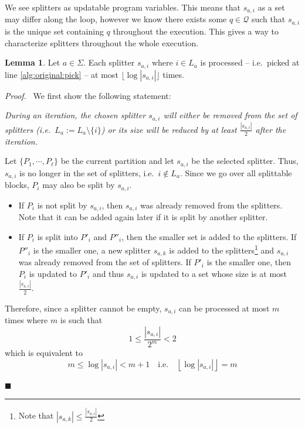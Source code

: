 \documentclass[12pt, a4 paper]{article}
\renewenvironment{proof}[1][Proof]{\begin{mdframed}[backgroundcolor=black!5, topline=false, rightline=false, bottomline=false, linecolor=black!15, linewidth=3pt]{\noindent\textit{#1.}\ }}{\noindent\par\hfill$\blacksquare$\end{mdframed}}
\theoremstyle{definition}
\newtheorem{lemma}{Lemma}
\begin{document}
We see splitters as updatable program variables. This means that $s_{a,i}$ as a set may differ along the loop, however we know there exists some $q \in \mathcal{Q}$ such that $s_{a,i}$ is the unique set containing $q$ throughout the execution. This gives a way to characterize splitters throughout the whole execution.
\begin{lemma}\label{lem:log}
    Let $a \in \Sigma$. Each splitter $s_{a,i}$ where $i\in L_a$ is processed -- i.e.\ picked at line \ref{alg:original:pick} -- at most $\lfloor \log \left| s_{a,i} \right| \rfloor$ times.
\end{lemma}
\begin{proof}
    We first show the following statement:

    \textit{During an iteration, the chosen splitter $s_{a,i}$ will either be removed from the set of splitters (i.e.\ $L_a := L_a \setminus \{i\}$) or its size will be reduced by at least $\frac{\left| s_{a, i}\right|}{2}$ after the iteration.}

    \bigskip
    Let $\{P_1, \cdots, P_\ell\}$ be the current partition and let $s_{a, i}$ be the selected splitter. Thus, $s_{a, i}$ is no longer in the set of splitters, i.e.\ $i \notin L_a$. Since we go over all splittable blocks, $P_i$ may also be split by $s_{a, i}$.
    \begin{itemize}
        \item If $P_i$ is not split by $s_{a, i}$, then $s_{a, i}$ was already removed from the splitters. Note that it can be added again later if it is split by another splitter.
        \item If $P_i$ is split into $P'_i$ and $P''_i$, then the smaller set is added to the splitters.
    If $P''_i$ is the smaller one, a new splitter $s_{a, k}$ is added to the splitters\footnote{Note that $\left| s_{a, k} \right| \leq \frac{\left| s_{a, i} \right|}{2}$} and $s_{a, i}$ was already removed from the set of splitters. If $P'_i$ is the smaller one, then $P_i$ is updated to $P'_i$ and thus $s_{a, i}$ is updated to a set whose size is at most $\frac{\left| s_{a, i} \right|}{2}$.
    \end{itemize}
    Therefore, since a splitter cannot be empty, $s_{a, i}$ can be processed at most $m$ times where $m$ is such that
    $$ 1 \leq \frac{\left| s_{a, i}\right|}{2^m} < 2$$
    which is equivalent to
    $$ m \leq \log \left| s_{a, i} \right| < m + 1 \quad \text{i.e.}\quad \left\lfloor\log \left| s_{a, i} \right|\right\rfloor = m $$
\end{proof}
\end{document}
